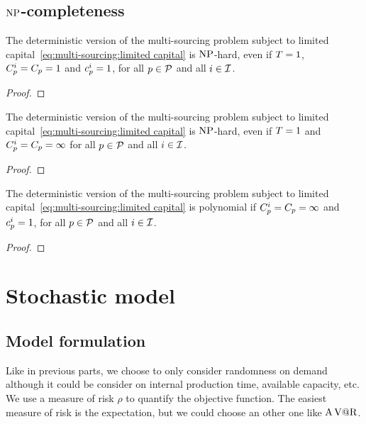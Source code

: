 \subsection{$\operatorname{NP}$-completeness}



\begin{prop}
The deterministic version of the multi-sourcing problem subject to limited capital~\eqref{eq:multi-sourcing:limited capital} is $\operatorname{NP}$-hard, even if $T=1$, $C_p^i=C_p=1$ and $c_p^i=1$, for all $p\in\mathcal{P}$ and all $i\in\mathcal{I}$.
\end{prop}

\begin{proof}
\tbc
\end{proof}


\begin{prop}
The deterministic version of the multi-sourcing problem subject to limited capital~\eqref{eq:multi-sourcing:limited capital} is $\operatorname{NP}$-hard, even if $T=1$ and $C_p^i=C_p=\infty$ for all $p\in\mathcal{P}$ and all $i\in\mathcal{I}$.
\end{prop}

\begin{proof}
\tbc
\end{proof}


\begin{prop}
The deterministic version of the multi-sourcing problem subject to limited capital~\eqref{eq:multi-sourcing:limited capital} is polynomial if $C_p^i=C_p=\infty$ and $c_p^i=1$, for all $p\in\mathcal{P}$ and all $i\in\mathcal{I}$.
\end{prop}

\begin{proof}
\tbc
\end{proof}





\section{Stochastic model}

\subsection{Model formulation}

Like in previous parts, we choose to only consider randomness on demand although it could be consider on internal production time, available capacity, etc. We use a measure of risk $\rho$ to quantify the objective function. The easiest measure of risk is the expectation, but we could choose an other one like $\operatorname{A\operatorname{V@R}}$.

